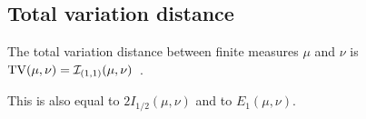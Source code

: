 





\subsection{Total variation distance}

\begin{definition}
  \label{def:TV}
  The total variation distance between finite measures $\mu$ and $\nu$ is $\operatorname{TV}(\mu, \nu) = \mathcal I_{(1,1)}(\mu, \nu)$~.
\end{definition}

This is also equal to $2 I_{1/2}(\mu, \nu)$ and to $E_1(\mu, \nu)$.

